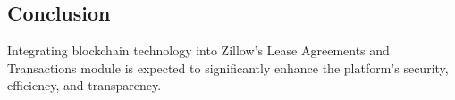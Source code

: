 \documentclass{article}
\begin{document}
\subsection{Conclusion}
Integrating blockchain technology into Zillow's Lease Agreements and Transactions module is expected to significantly enhance the platform's security, efficiency, and transparency.
\end{document}
